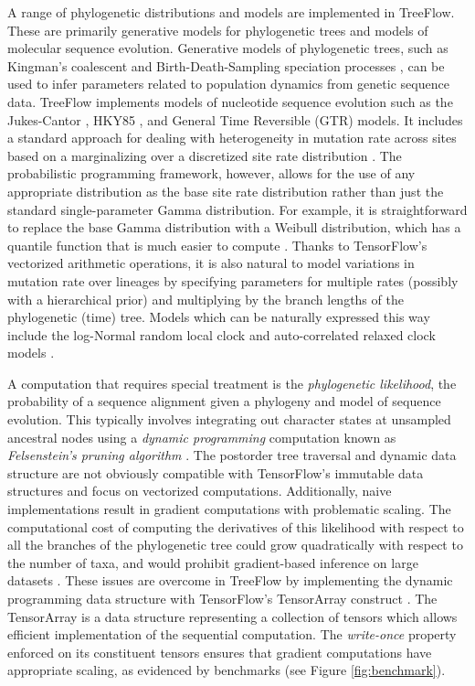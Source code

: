 A range of phylogenetic distributions and models are implemented in TreeFlow. These are primarily generative models for phylogenetic trees and models of molecular sequence evolution. Generative models of phylogenetic trees, such as Kingman's coalescent \cite{kuhner1995estimating} and Birth-Death-Sampling speciation processes \cite{stadler2009incomplete}, can be used to infer parameters related to population dynamics from genetic sequence data. TreeFlow implements models of nucleotide sequence evolution such as the Jukes-Cantor \cite{jukes1969evolution}, HKY85 \cite{hasegawa1985dating}, and General Time Reversible (GTR) \cite{tavare1986some} models. It includes a standard approach for dealing with heterogeneity in mutation rate across sites based on a marginalizing over a discretized site rate distribution \cite{yang1994maximum}. The probabilistic programming framework, however, allows for the use of any appropriate distribution as the base site rate distribution rather than just the standard single-parameter Gamma distribution. For example, it is straightforward to replace the base Gamma distribution with a Weibull distribution, which has a quantile function that is much easier to compute \cite{fourment2019evaluating}. Thanks to TensorFlow's vectorized arithmetic operations, it is also natural to model variations in mutation rate over lineages by specifying parameters for multiple rates (possibly with a hierarchical prior) and multiplying by the branch lengths of the phylogenetic (time) tree. Models which can be naturally expressed this way include the log-Normal random local clock \cite{drummond2006relaxed} and auto-correlated relaxed clock models \cite{thorne1998estimating}.

A computation that requires special treatment is the \textit{phylogenetic likelihood}, the probability of a sequence alignment given a phylogeny and model of sequence evolution. This typically involves integrating out character states at unsampled ancestral nodes using a \textit{dynamic programming} computation known as \textit{Felsenstein's pruning algorithm} \cite{felsenstein1981evolutionary}. The postorder tree traversal and dynamic data structure are not obviously compatible with TensorFlow's immutable data structures and focus on vectorized computations. Additionally, naive implementations result in gradient computations with problematic scaling. The computational cost of computing the derivatives of this likelihood with respect to all the branches of the phylogenetic tree could grow quadratically with respect to the number of taxa, and would prohibit gradient-based inference on large datasets \cite{ji2020gradients}. These issues are overcome in TreeFlow by implementing the dynamic programming data structure with TensorFlow's TensorArray construct \cite{yu2018dynamic}. The TensorArray is a data structure representing a collection of tensors which allows efficient implementation of the sequential computation. The \textit{write-once} property enforced on its constituent tensors ensures that gradient computations have appropriate scaling, as evidenced by benchmarks (see Figure \ref{fig:benchmark}).

